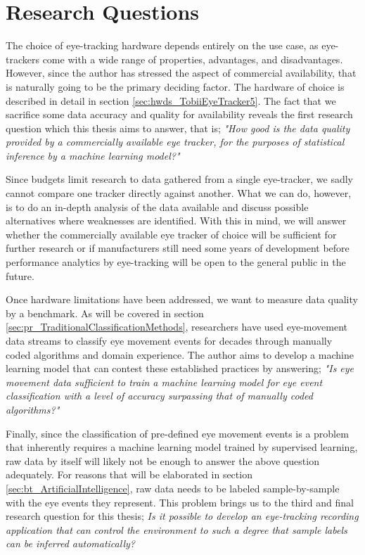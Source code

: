 \section{Research Questions} \label{sec:intro_research}

The choice of eye-tracking hardware depends entirely on the use case, as eye-trackers come with a wide range of properties, advantages, and disadvantages. However, since the author has stressed the aspect of commercial availability, that is naturally going to be the primary deciding factor. The hardware of choice is described in detail in section \ref{sec:hwds_TobiiEyeTracker5}. The fact that we sacrifice some data accuracy and quality for availability reveals the first research question which this thesis aims to answer, that is; \textit{"How good is the data quality provided by a commercially available eye tracker, for the purposes of statistical inference by a machine learning model?"}

Since budgets limit research to data gathered from a single eye-tracker, we sadly cannot compare one tracker directly against another. What we can do, however, is to do an in-depth analysis of the data available and discuss possible alternatives where weaknesses are identified. With this in mind, we will answer whether the commercially available eye tracker of choice will be sufficient for further research or if manufacturers still need some years of development before performance analytics by eye-tracking will be open to the general public in the future.

Once hardware limitations have been addressed, we want to measure data quality by a benchmark. As will be covered in section \ref{sec:pr_TraditionalClassificationMethods}, researchers have used eye-movement data streams to classify eye movement events for decades through manually coded algorithms and domain experience. The author aims to develop a machine learning model that can contest these established practices by answering; \textit{"Is eye movement data sufficient to train a machine learning model for eye event classification with a level of accuracy surpassing that of manually coded algorithms?"} 

Finally, since the classification of pre-defined eye movement events is a problem that inherently requires a machine learning model trained by supervised learning, raw data by itself will likely not be enough to answer the above question adequately. For reasons that will be elaborated in section \ref{sec:bt_ArtificialIntelligence}, raw data needs to be labeled sample-by-sample with the eye events they represent. This problem brings us to the third and final research question for this thesis; \textit{Is it possible to develop an eye-tracking recording application that can control the environment to such a degree that sample labels can be inferred automatically?} 

